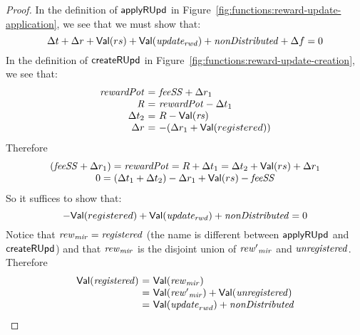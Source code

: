 \begin{proof}
  In the definition of $\mathsf{applyRUpd}$ in Figure~\ref{fig:functions:reward-update-application},
  we see that we must show that:
  \begin{equation*}
    \Delta t + \Delta r + \mathsf{Val}(rs) + \mathsf{Val}(\mathit{update_{rwd}}) + \mathit{nonDistributed} + \Delta f = 0
  \end{equation*}
  In the definition of $\mathsf{createRUpd}$ in Figure~\ref{fig:functions:reward-update-creation},
  we see that:
  \begin{equation*}
    \begin{array}{r@{~=~}l}
      \var{rewardPot} & \var{feeSS} + \Delta r_1 \\
      \var{R} & \var{rewardPot} - \Delta t_1 \\
      \Delta t_2 & R - \Val(\var{rs})\\
      \Delta r & - (\Delta r_1+\Val(registered)) \\
    \end{array}
  \end{equation*}
  Therefore
  \begin{equation*}
    \begin{array}{c}
      (\mathit{feeSS} + \Delta r_1) = \mathit{rewardPot} = R + \Delta t_1 = \Delta t_2 + \mathsf{Val}(rs) + \Delta r_1  \\
      0 = (\Delta t_1 + \Delta t_2 ) - \Delta r_1 + \mathsf{Val}(rs)- \mathit{feeSS} \\
    \end{array}
  \end{equation*}
  So it suffices to show that:
  \begin{equation*}
    -\mathsf{Val}(registered) + \mathsf{Val}(\mathit{update_{rwd}}) + \mathit{nonDistributed} = 0
  \end{equation*}
  Notice that $\mathit{rew}_{\mathit{mir}} = \mathit{registered}$
    (the name is different between $\mathsf{applyRUpd}$ and $\mathsf{createRUpd}$)
    and that $\mathit{rew}_{\mathit{mir}}$ is the disjoint union of
    $\mathit{rew'}_{\mathit{mir}}$ and $\mathit{unregistered}$.
    Therefore
  \begin{equation*}
    \begin{array}{r@{~=~}l}
      \Val(\var{registered}) & \Val(\var{rew}_{\var{mir}}) \\
                             & \Val(\var{rew'}_{\var{mir}}) + \Val(\var{unregistered}) \\
                             & \Val(\var{update}_{rwd}) + \var{nonDistributed}
    \end{array}
  \end{equation*}
\end{proof}

